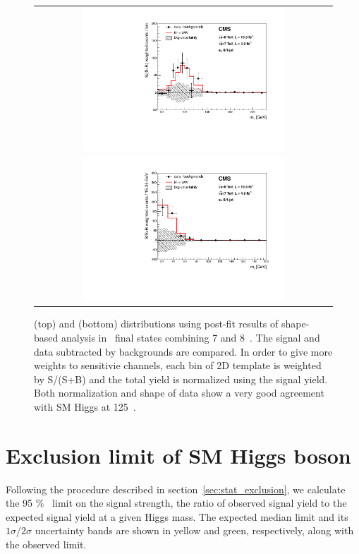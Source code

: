 \begin{figure}[htp] 
\centering 
\begin{tabular}{c} 
\includegraphics[width=0.7\textwidth]{figures/dataminusbkg_mt.pdf} 
\\
\includegraphics[width=0.7\textwidth]{figures/dataminusbkg_mll.pdf} 
\end{tabular} 
\caption{\mT(top) and \mll(bottom) distributions using post-fit results 
of shape-based analysis in \DF\ final states combining 7 and 8~\TeV.
The signal and data subtracted by backgrounds are compared. 
In order to give more weights to sensitivie channels, each bin of 2D 
template is weighted by S/(S+B) and the total yield is normalized using the signal yield. 
Both normalization and shape of data show a very good agreement with SM Higgs at 125~\GeV. } 
\label{fig:post1Dprojection_dmb} 
\end{figure} 

\section{Exclusion limit of SM Higgs boson}  

Following the procedure described in section~\ref{sec:stat_exclusion}, 
we calculate the 95 \% \CLs\ limit on the signal strength, 
the ratio of observed signal yield to the expected signal yield 
at a given Higgs mass. The expected median limit and its $1\sigma$/$2\sigma$ uncertainty
bands are shown in yellow and green, respectively, along with the observed limit. 

